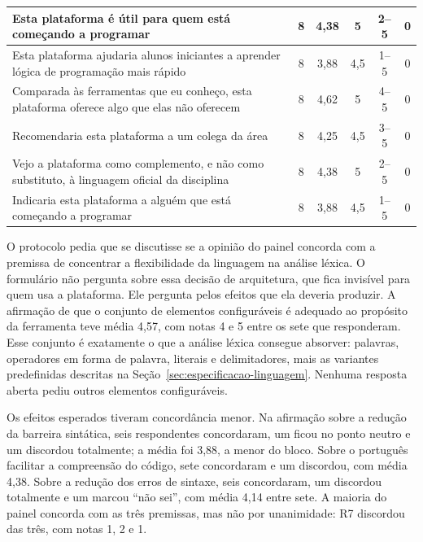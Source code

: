 \begin{table}[htbp]
\begin{tabular}{|p{8.0cm}|c|c|c|c|c|}
Esta plataforma é útil para quem está começando a programar & 8 & 4,38 & 5 & 2--5 & 0 \\\hline
Esta plataforma ajudaria alunos iniciantes a aprender lógica de programação mais rápido & 8 & 3,88 & 4,5 & 1--5 & 0 \\\hline
Comparada às ferramentas que eu conheço, esta plataforma oferece algo que elas não oferecem & 8 & 4,62 & 5 & 4--5 & 0 \\\hline
Recomendaria esta plataforma a um colega da área & 8 & 4,25 & 4,5 & 3--5 & 0 \\\hline
Vejo a plataforma como complemento, e não como substituto, à linguagem oficial da disciplina & 8 & 4,38 & 5 & 2--5 & 0 \\\hline
Indicaria esta plataforma a alguém que está começando a programar & 8 & 3,88 & 4,5 & 1--5 & 0 \\\hline
\end{tabular}
\end{table}

O protocolo pedia que se discutisse se a opinião do painel concorda com a premissa de concentrar a flexibilidade da linguagem na análise léxica. O formulário não pergunta sobre essa decisão de arquitetura, que fica invisível para quem usa a plataforma. Ele pergunta pelos efeitos que ela deveria produzir. A afirmação de que o conjunto de elementos configuráveis é adequado ao propósito da ferramenta teve média 4,57, com notas 4 e 5 entre os sete que responderam. Esse conjunto é exatamente o que a análise léxica consegue absorver: palavras, operadores em forma de palavra, literais e delimitadores, mais as variantes predefinidas descritas na Seção~\ref{sec:especificacao-linguagem}. Nenhuma resposta aberta pediu outros elementos configuráveis.

Os efeitos esperados tiveram concordância menor. Na afirmação sobre a redução da barreira sintática, seis respondentes concordaram, um ficou no ponto neutro e um discordou totalmente; a média foi 3,88, a menor do bloco. Sobre o português facilitar a compreensão do código, sete concordaram e um discordou, com média 4,38. Sobre a redução dos erros de sintaxe, seis concordaram, um discordou totalmente e um marcou ``não sei'', com média 4,14 entre sete. A maioria do painel concorda com as três premissas, mas não por unanimidade: R7 discordou das três, com notas 1, 2 e 1.

